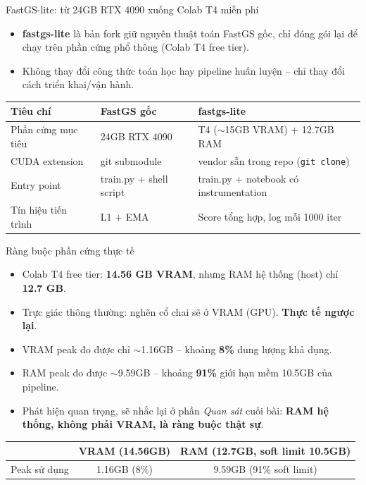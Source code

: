 
\begin{frame}{FastGS-lite: từ 24GB RTX 4090 xuống Colab T4 miễn phí}
\begin{itemize}
    \item \textbf{fastgs-lite} là bản fork giữ nguyên thuật toán FastGS gốc, chỉ đóng gói lại để chạy trên phần cứng phổ thông (Colab T4 free tier).
    \item Không thay đổi công thức toán học hay pipeline huấn luyện -- chỉ thay đổi cách triển khai/vận hành.
\end{itemize}
\vspace{0.3em}
\footnotesize
\begin{table}
\centering
\begin{tabular}{lll}
\toprule
\textbf{Tiêu chí} & \textbf{FastGS gốc} & \textbf{fastgs-lite} \\
\midrule
Phần cứng mục tiêu & 24GB RTX 4090 & T4 ($\sim$15GB VRAM) + 12.7GB RAM \\
CUDA extension & git submodule & vendor sẵn trong repo (\texttt{git clone}) \\
Entry point & train.py + shell script & train.py + notebook có instrumentation \\
Tín hiệu tiến trình & L1 + EMA & Score tổng hợp, log mỗi 1000 iter \\
\bottomrule
\end{tabular}
\end{table}
\end{frame}

\begin{frame}{Ràng buộc phần cứng thực tế}
\begin{itemize}
    \item Colab T4 free tier: \textbf{14.56 GB VRAM}, nhưng RAM hệ thống (host) chỉ \textbf{12.7 GB}.
    \item Trực giác thông thường: nghẽn cổ chai sẽ ở VRAM (GPU). \textbf{Thực tế ngược lại}.
    \item VRAM peak đo được chỉ $\sim$1.16GB -- khoảng \textbf{8\%} dung lượng khả dụng.
    \item RAM peak đo được $\sim$9.59GB -- khoảng \textbf{91\%} giới hạn mềm 10.5GB của pipeline.
    \item[$\Rightarrow$] Phát hiện quan trọng, sẽ nhắc lại ở phần \emph{Quan sát} cuối bài: \textbf{RAM hệ thống, không phải VRAM, là ràng buộc thật sự}.
\end{itemize}
\vspace{0.5em}
\centering
\footnotesize
\begin{tabular}{lcc}
\toprule
 & VRAM (14.56GB) & RAM (12.7GB, soft limit 10.5GB) \\
\midrule
Peak sử dụng & 1.16GB (8\%) & 9.59GB (91\% soft limit) \\
\bottomrule
\end{tabular}
\end{frame}

